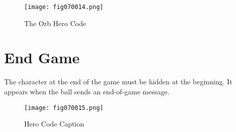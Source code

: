 \begin{figure}[H]
   \centering
   \texttt{[image: fig070014.png]}
   \caption{The Orb Hero Code}
\label{fig070014}
\end{figure}

\section{End Game}
The character at the end of the game must be hidden at the beginning. It appears when the ball sends an end-of-game message.

\begin{figure}[H]
   \centering
   \texttt{[image: fig070015.png]}
   \caption{Hero Code Caption}
\label{fig070015}
\end{figure}
